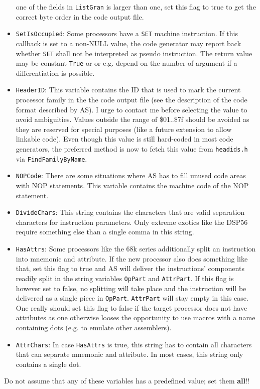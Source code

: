 \documentclass[12pt,twoside]{report}
\newcommand{\bb}[1]{{\bf #1}}
\newcommand{\tty}[1]{{\tt #1}}
\newcommand{\asname}{{AS}}
\begin{document}
\begin{itemize}
{      one of the fields in \tty{ListGran} is larger than one, set this flag
      to true to get the correct byte order in the code output file.}
\item{\tty{SetIsOccupied}: Some processors have a \tty{SET} machine instruction.
      If this callback is set to a non-NULL value, the code generator
      may report back whether \tty{SET} shall not be interpreted as
      pseudo instruction.  The return value may be constant \tty{True} or
      or e.g. depend on the number of argument if a differentiation is
      possible.}
\item{\tty{HeaderID}: This variable contains the ID that is used to mark the
      current processor family in the the code output file (see the
      description of the code format described by \asname{}).  I urge to
      contact me before selecting the value to avoid ambiguities.
      Values outside the range of \$01..\$7f should be avoided as they
      are reserved for special purposes (like a future extension to
      allow linkable code). Even though this value is still hard-coded
      in most code generators, the preferred method is now to fetch this
      value from {\tt headids.h} via {\tt FindFamilyByName}.}
\item{\tty{NOPCode}: There are some situations where \asname{} has to fill unused
      code areas with NOP statements.  This variable contains the
      machine code of the NOP statement.}
\item{\tty{DivideChars}: This string contains the characters that are valid
      separation characters for instruction parameters.  Only extreme
      exotics like the DSP56 require something else than a single comma
      in this string.}
\item{\tty{HasAttrs}: Some processors like the 68k series additionally split
      an instruction into mnemonic and attribute.  If the new processor
      also does something like that, set this flag to true and \asname{} will
      deliver the instructions' components readily split in the string
      variables \tty{OpPart} and \tty{AttrPart}.  If this flag is however set to
      false, no splitting will take place and the instruction will be
      delivered as a single piece in \tty{OpPart}.  \tty{AttrPart} will stay empty
      in this case.  One really should set this flag to false if the
      target processor does not have attributes as one otherwise looses
      the opportunity to use macros with a name containing dots (e.g.
      to emulate other assemblers).}
\item{\tty{AttrChars}: In case \tty{HasAttrs} is true, this string has to contain
      all characters that can separate mnemonic and attribute.  In most
      cases, this string only contains a single dot.}
\end{itemize}
Do not assume that any of these variables has a predefined value; set
them \bb{all}!!
\end{document}
